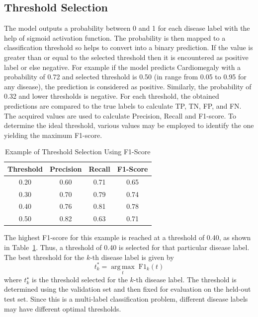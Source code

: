\documentclass[conference]{IEEEtran}
\begin{document}
\subsection{Threshold Selection}
The model outputs a probability between 0 and 1 for each disease label with the help of sigmoid activation function. The probability is then mapped to a classification threshold so helps to convert into a binary prediction. If the value is greater than or equal to the selected threshold then it is encountered as positive label or else negative. For example if the model predicts Cardiomegaly with a probability of 0.72 and selected threshold is 0.50 (in range from 0.05 to 0.95 for any disease), the prediction is considered as positive. Similarly, the probability of 0.32 and lower thresholds is negative. For each threshold, the obtained predictions are compared to the true labels to calculate TP, TN, FP, and FN. The acquired values are used to calculate Precision, Recall and F1-score. To determine the ideal threshold, various values may be employed to identify the one yielding the maximum F1-score.
\begin{table}[!htbp]
\caption{Example of Threshold Selection Using F1-Score}
\label{tab:threshold}
\centering
\renewcommand{\arraystretch}{1.1}
\begin{tabular}{cccc}
\hline
\textbf{Threshold} & \textbf{Precision} & \textbf{Recall} & \textbf{F1-Score} \\
\hline
0.20 & 0.60 & 0.71 & 0.65 \\
0.30 & 0.70 & 0.79 & 0.74 \\
0.40 & 0.76 & 0.81 & 0.78 \\
0.50 & 0.82 & 0.63 & 0.71 \\
\hline
\end{tabular}
\end{table}
The highest F1-score for this example is reached at a threshold of 0.40, as shown in Table~\ref{tab:threshold}. Thus, a threshold of 0.40 is selected for that particular disease label.
The best threshold for the $k$-th disease label is given by
\begin{equation}
t_k^{*}
=
\underset{t}{\operatorname{arg\,max}}
\;
\mathrm{F1}_k(t)
\end{equation}
where $t_k^{\star}$ is the threshold selected for the $k$-th disease label.
The threshold is determined using the validation set and then fixed for evaluation on the held-out test set. Since this is a multi-label classification problem, different disease labels may have different optimal thresholds.
\end{document}
